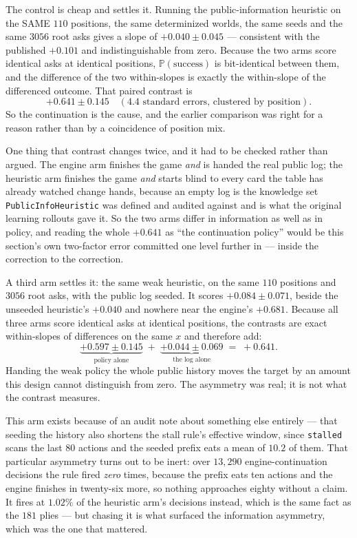 \documentclass[11pt,a4paper]{article}
\newcommand{\Prob}{\ensuremath{\mathbb{P}}}
\begin{document}
The control is cheap and settles it. Running the public-information heuristic on
the SAME $110$ positions, the same determinized worlds, the same seeds and the
same $3056$ root asks gives a slope of $\mathbf{+0.040 \pm 0.045}$ --- consistent
with the published $+0.101$ and indistinguishable from zero. Because the two arms
score identical asks at identical positions, $\Prob(\text{success})$ is
bit-identical between them, and the difference of the two within-slopes is
exactly the within-slope of the differenced outcome. That paired contrast is
\[
  +0.641 \pm 0.145 \quad (4.4\text{ standard errors, clustered by position}).
\]
So the continuation is the cause, and the earlier comparison was right for a
reason rather than by a coincidence of position mix.

One thing that contrast changes twice, and it had to be checked rather than
argued. The engine arm finishes the game \emph{and} is handed the real public
log; the heuristic arm finishes the game \emph{and} starts blind to every card
the table has already watched change hands, because an empty log is the
knowledge set \texttt{PublicInfoHeuristic} was defined and audited against and
is what the original learning rollouts gave it. So the two arms differ in
information as well as in policy, and reading the whole $+0.641$ as ``the
continuation policy'' would be this section's own two-factor error committed one
level further in --- inside the correction to the correction.

A third arm settles it: the same weak heuristic, on the same $110$ positions and
$3056$ root asks, with the public log seeded. It scores
$\mathbf{+0.084 \pm 0.071}$, beside the unseeded heuristic's $+0.040$ and
nowhere near the engine's $+0.681$. Because all three arms score identical asks
at identical positions, the contrasts are exact within-slopes of differences on
the same $x$ and therefore add:
\[
  \underbrace{+0.597 \pm 0.145}_{\text{policy alone}}
  \;+\;
  \underbrace{+0.044 \pm 0.069}_{\text{the log alone}}
  \;=\; +0.641 .
\]
Handing the weak policy the whole public history moves the target by an amount
this design cannot distinguish from zero. The asymmetry was real; it is not what
the contrast measures.

This arm exists because of an audit note about something else entirely --- that
seeding the history also shortens the stall rule's effective window, since
\texttt{stalled} scans the last $80$ actions and the seeded prefix eats a mean
of $10.2$ of them. That particular asymmetry turns out to be inert: over $13{,}290$
engine-continuation decisions the rule fired \emph{zero} times, because the
prefix eats ten actions and the engine finishes in twenty-six more, so nothing
approaches eighty without a claim. It fires at $1.02\%$ of the heuristic arm's
decisions instead, which is the same fact as the $181$ plies --- but chasing it
is what surfaced the information asymmetry, which was the one that mattered.
\end{document}

